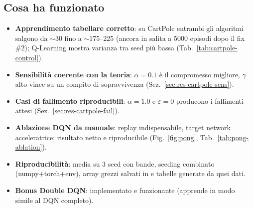 \subsection{Cosa ha funzionato}
\begin{itemize}[nosep]
  \item \textbf{Apprendimento tabellare corretto}: su CartPole entrambi gli
        algoritmi salgono da $\sim$30 fino a $\sim$175--225 (ancora in salita a
        5000 episodi dopo il fix \#2); Q\hbox{-}Learning mostra varianza tra seed
        pi\`u bassa (Tab.~\ref{tab:cartpole-control}).
  \item \textbf{Sensibilit\`a coerente con la teoria}: $\alpha=0.1$ \`e il
        compromesso migliore, $\gamma$ alto vince su un compito di
        sopravvivenza (Sez.~\ref{sec:res-cartpole-sens}).
  \item \textbf{Casi di fallimento riproducibili}: $\alpha=1.0$ e
        $\varepsilon=0$ producono i fallimenti attesi
        (Sez.~\ref{sec:res-cartpole-fail}).
  \item \textbf{Ablazione DQN da manuale}: replay indispensabile, target network
        acceleratrice; risultato netto e riproducibile
        (Fig.~\ref{fig:pong}, Tab.~\ref{tab:pong-ablation}).
  \item \textbf{Riproducibilit\`a}: media su 3 seed con bande, seeding combinato
        (numpy+torch+env), array grezzi salvati in  e tabelle
        generate da quei dati.
  \item \textbf{Bonus Double DQN}: implementato e funzionante (apprende in modo
        simile al DQN completo).
\end{itemize}

